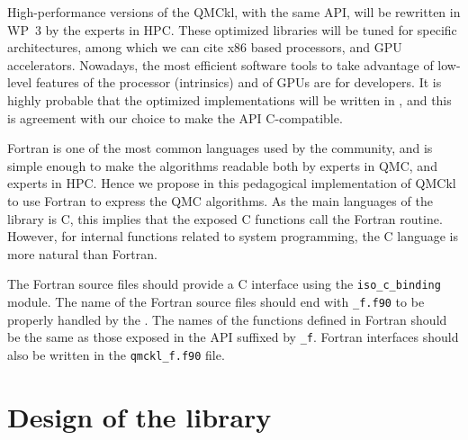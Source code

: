 High-performance versions of the \ac{QMCkl}, with the same \ac{API},
will be rewritten in \ac{WP}~3 by the experts in \ac{HPC}. These
optimized libraries will be tuned for specific architectures, among
which we can cite x86 based processors, and \ac{GPU} accelerators.
Nowadays, the most efficient software tools to take advantage of
low-level features of the processor (intrinsics) and of \acp{GPU} are
for {\CC} developers. It is highly probable that the optimized
implementations will be written in {\CC}, and this is agreement with our
choice to make the \ac{API} C-compatible.


Fortran is one of the most common languages used by the community, and
is simple enough to make the algorithms readable both by experts in
\ac{QMC}, and experts in \ac{HPC}. Hence we propose in this
pedagogical implementation of \ac{QMCkl} to use Fortran to express the
QMC algorithms. As the main languages of the library is C, this
implies that the exposed C functions call the Fortran routine.
However, for internal functions related to system programming, the C
language is more natural than Fortran.

The  Fortran  source  files  should provide  a  C  interface  using the
\texttt{iso_c_binding} module. The name of the Fortran source files
should end with \texttt{_f.f90} to be properly handled by the
{\Makefile}.  The names of the functions defined in Fortran should be the
same as those exposed in the \ac{API} suffixed by \texttt{_f}.
Fortran interfaces should also be written in the
\texttt{qmckl_f.f90} file.




\section{Design of the library}

